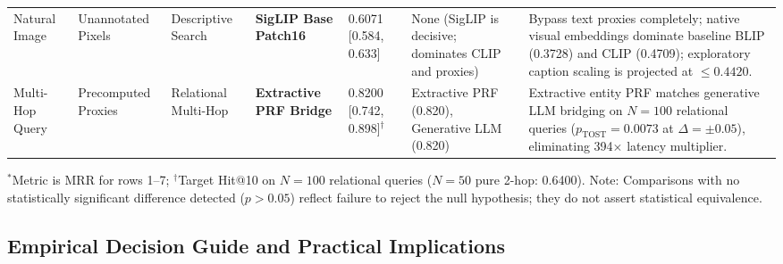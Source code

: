 \begin{table}[t]
\begin{tabular}{@{}p{1.6cm}p{1.8cm}p{1.8cm}p{2.1cm}p{1.8cm}p{2.3cm}p{4.1cm}@{}}
Natural Image & Unannotated Pixels & Descriptive Search & \textbf{SigLIP Base Patch16} & 0.6071 [0.584, 0.633] & None (SigLIP is decisive; dominates CLIP and proxies) & Bypass text proxies completely; native visual embeddings dominate baseline BLIP (0.3728) and CLIP (0.4709); exploratory caption scaling is projected at $\le 0.4420$. \\
Multi-Hop Query & Precomputed Proxies & Relational Multi-Hop & \textbf{Extractive PRF Bridge} & 0.8200 [0.742, 0.898]$^\dagger$ & Extractive PRF (0.820), Generative LLM (0.820) & Extractive entity PRF matches generative LLM bridging on $N=100$ relational queries ($p_{\text{TOST}}=0.0073$ at $\Delta=\pm 0.05$), eliminating 394$\times$ latency multiplier. \\
\bottomrule
\end{tabular}
\vspace{0mm}\newline
\raggedright\scriptsize $^*$Metric is MRR for rows 1--7; $^\dagger$Target Hit@10 on $N=100$ relational queries ($N=50$ pure 2-hop: 0.6400). Note: Comparisons with no statistically significant difference detected ($p > 0.05$) reflect failure to reject the null hypothesis; they do not assert statistical equivalence.
\end{table}

\subsection{Empirical Decision Guide and Practical Implications}
\label{sec:practical_implications}

